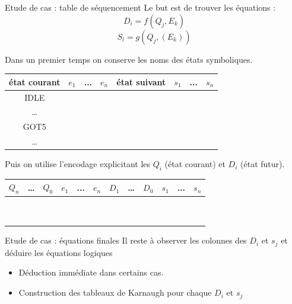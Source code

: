 \documentclass[xcolor=table]{beamer}
\begin{document}
\begin{frame}{Etude de cas : table de séquencement}
  Le but est de trouver les équations :   $$ D_i=f(Q_j,E_k) $$
    $$ S_l=g(Q_j,(E_k)) $$


Dans un premier temps on conserve les noms des états symboliques.
{\footnotesize
\begin{table}[!htb]
  \centering

  \begin{tabular}{|c|c|c|c||c|c|c|c|}
        \hline
        \cellcolor{blue!25} état courant & $e_1$ & ... & $e_n$ &  \cellcolor{red!25} état suivant & $s_1$ & ... & $s_n$ \\ \hline
        IDLE        & ~    & ~     & ~            & ~            & ~        & ~   & ~    \\ \hline
        \dots       & ~    & ~     & ~            & ~            & ~        & ~   & ~    \\ \hline
        GOT5        & ~    & ~     & ~            & ~            & ~        & ~   & ~    \\ \hline
        \dots       & ~    & ~     & ~            & ~            & ~        & ~   & ~    \\ \hline
    \end{tabular}
\end{table}
}

Puis on utilise l'encodage explicitant les $Q_i$ (état courant) et $D_i$ (état futur).
{\footnotesize
\begin{table}[!htb]
  \centering
    \begin{tabular}{|c|c|c|c|c|c||c|c|c|c|c|c|}
        \hline
        \cellcolor{blue!25}$Q_n$ & \cellcolor{blue!25}\dots & \cellcolor{blue!25} $Q_0$ &  $e_1$ & ... & $e_n$ & \cellcolor{red!25}$D_1$ & \cellcolor{red!25}\dots & \cellcolor{red!25}$D_0$ & $s_1$ & ... & $s_n$ \\ \hline
        ~   & ~    & ~  & ~  & ~  & ~  & ~  & ~  & ~        & ~   & ~ & ~        \\
        ~   & ~    & ~  & ~  & ~  & ~  & ~  & ~  & ~        & ~   & ~ & ~        \\
        \hline
    \end{tabular}
\end{table}
}

\end{frame}

\begin{frame}{Etude de cas : équations finales}
Il reste à observer les colonnes des $D_i$ et $s_j$ et déduire les équations logiques
  \begin{itemize}
    \item Déduction immédiate dans certains cas.
    \item Construction des tableaux de Karnaugh pour chaque $D_i$ et $s_j$
  \end{itemize}
\end{frame}
\end{document}
